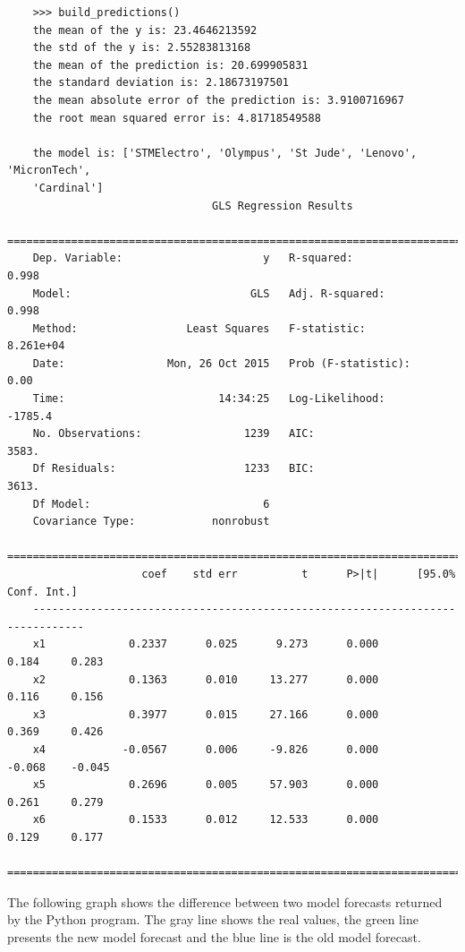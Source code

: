 \documentclass[
  twoside,
  11pt, a4paper,
  footinclude=true,
  headinclude=true,
  cleardoublepage=empty
]{scrreprt}
\begin{document}
    \begin{verbatim}
    >>> build_predictions()
    the mean of the y is: 23.4646213592
    the std of the y is: 2.55283813168
    the mean of the prediction is: 20.699905831
    the standard deviation is: 2.18673197501
    the mean absolute error of the prediction is: 3.9100716967
    the root mean squared error is: 4.81718549588
    
    the model is: ['STMElectro', 'Olympus', 'St Jude', 'Lenovo', 'MicronTech',
    'Cardinal']
                                GLS Regression Results                            
    ==============================================================================
    Dep. Variable:                      y   R-squared:                       0.998
    Model:                            GLS   Adj. R-squared:                  0.998
    Method:                 Least Squares   F-statistic:                 8.261e+04
    Date:                Mon, 26 Oct 2015   Prob (F-statistic):               0.00
    Time:                        14:34:25   Log-Likelihood:                -1785.4
    No. Observations:                1239   AIC:                             3583.
    Df Residuals:                    1233   BIC:                             3613.
    Df Model:                           6                                         
    Covariance Type:            nonrobust                                         
    ==============================================================================
                     coef    std err          t      P>|t|      [95.0% Conf. Int.]
    ------------------------------------------------------------------------------
    x1             0.2337      0.025      9.273      0.000         0.184     0.283
    x2             0.1363      0.010     13.277      0.000         0.116     0.156
    x3             0.3977      0.015     27.166      0.000         0.369     0.426
    x4            -0.0567      0.006     -9.826      0.000        -0.068    -0.045
    x5             0.2696      0.005     57.903      0.000         0.261     0.279
    x6             0.1533      0.012     12.533      0.000         0.129     0.177
    ==============================================================================
    \end{verbatim}
    The following graph shows the difference between two model forecasts returned by the Python program. The gray line shows the real values, the green line presents the new model forecast and the blue line is the old model forecast.\\
\end{document}
